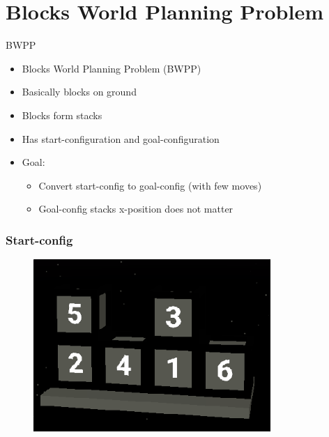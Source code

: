 \documentclass[12pt]{beamer}
\begin{document}
    \section{Blocks World Planning Problem}
        \begin{frame}[fragile]{BWPP}
           \begin{itemize}
               \item Blocks World Planning Problem (BWPP)
               \item Basically blocks on ground
               \item Blocks form stacks
               \item Has start-configuration and goal-configuration
               \item Goal:
               \begin{itemize}
                   \item Convert start-config to goal-config (with few moves)
                   \item Goal-config stacks x-position does not matter
               \end{itemize}
           \end{itemize} 
        \end{frame}

        \begin{frame}[fragile]
            \frametitle{Start-config}
            \begin{figure}
                \includegraphics[width=9cm]{start_config.png}
            \end{figure} 
        \end{frame}
        
\end{document}
